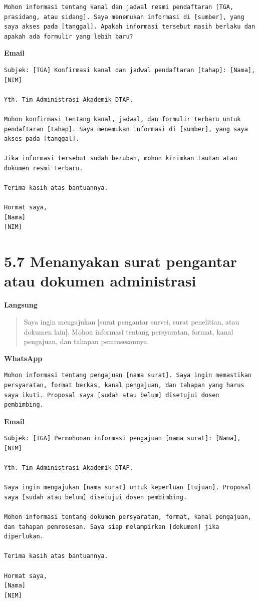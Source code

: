 \documentclass[
  indonesian,
]{article}
\renewcommand{\subsection}{\section}
\begin{document}
\begin{verbatim}
Mohon informasi tentang kanal dan jadwal resmi pendaftaran [TGA, prasidang, atau sidang]. Saya menemukan informasi di [sumber], yang saya akses pada [tanggal]. Apakah informasi tersebut masih berlaku dan apakah ada formulir yang lebih baru?
\end{verbatim}

\textbf{Email}

\begin{verbatim}
Subjek: [TGA] Konfirmasi kanal dan jadwal pendaftaran [tahap]: [Nama], [NIM]

Yth. Tim Administrasi Akademik DTAP,

Mohon konfirmasi tentang kanal, jadwal, dan formulir terbaru untuk pendaftaran [tahap]. Saya menemukan informasi di [sumber], yang saya akses pada [tanggal].

Jika informasi tersebut sudah berubah, mohon kirimkan tautan atau dokumen resmi terbaru.

Terima kasih atas bantuannya.

Hormat saya,
[Nama]
[NIM]
\end{verbatim}

\subsection{5.7 Menanyakan surat pengantar atau dokumen
administrasi}\label{menanyakan-surat-pengantar-atau-dokumen-administrasi}

\textbf{Langsung}

\begin{quote}
Saya ingin mengajukan {[}surat pengantar survei, surat penelitian, atau
dokumen lain{]}. Mohon informasi tentang persyaratan, format, kanal
pengajuan, dan tahapan pemrosesannya.
\end{quote}

\textbf{WhatsApp}

\begin{verbatim}
Mohon informasi tentang pengajuan [nama surat]. Saya ingin memastikan persyaratan, format berkas, kanal pengajuan, dan tahapan yang harus saya ikuti. Proposal saya [sudah atau belum] disetujui dosen pembimbing.
\end{verbatim}

\textbf{Email}

\begin{verbatim}
Subjek: [TGA] Permohonan informasi pengajuan [nama surat]: [Nama], [NIM]

Yth. Tim Administrasi Akademik DTAP,

Saya ingin mengajukan [nama surat] untuk keperluan [tujuan]. Proposal saya [sudah atau belum] disetujui dosen pembimbing.

Mohon informasi tentang dokumen persyaratan, format, kanal pengajuan, dan tahapan pemrosesan. Saya siap melampirkan [dokumen] jika diperlukan.

Terima kasih atas bantuannya.

Hormat saya,
[Nama]
[NIM]
\end{verbatim}
\end{document}
